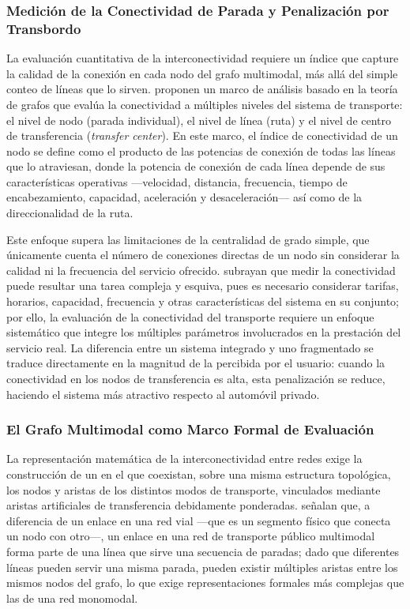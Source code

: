 \subsubsection{Medición de la Conectividad de Parada y Penalización por Transbordo}
\label{subsubsec:penalizacion-transbordo}

La evaluación cuantitativa de la interconectividad requiere un índice que capture la
calidad de la conexión en cada nodo del grafo multimodal, más allá del simple conteo
de líneas que lo sirven. \textcite{mishra2012} proponen un marco de análisis basado
en la teoría de grafos que evalúa la conectividad a múltiples niveles del sistema de
transporte: el nivel de nodo (parada individual), el nivel de línea (ruta) y el nivel de
centro de transferencia (\textit{transfer center}). En este marco, el índice de
conectividad de un nodo se define como el producto de las potencias de conexión de
todas las líneas que lo atraviesan, donde la potencia de conexión de cada línea
depende de sus características operativas ---velocidad, distancia, frecuencia, tiempo
de encabezamiento, capacidad, aceleración y desaceleración--- así como de la
direccionalidad de la ruta.

Este enfoque supera las limitaciones de la centralidad de grado simple, que
únicamente cuenta el número de conexiones directas de un nodo sin considerar la
calidad ni la frecuencia del servicio ofrecido. \textcite{mishra2012} subrayan que
medir la conectividad puede resultar una tarea compleja y esquiva, pues es necesario
considerar tarifas, horarios, capacidad, frecuencia y otras características del sistema
en su conjunto; por ello, la evaluación de la conectividad del transporte requiere un
enfoque sistemático que integre los múltiples parámetros involucrados en la
prestación del servicio real. La diferencia entre un sistema integrado y uno
fragmentado se traduce directamente en la magnitud de la  percibida por el usuario: cuando la conectividad en los nodos de
transferencia es alta, esta penalización se reduce, haciendo el sistema más atractivo
respecto al automóvil privado.

\subsubsection{El Grafo Multimodal como Marco Formal de Evaluación}
\label{subsubsec:grafo-multimodal}

La representación matemática de la interconectividad entre redes exige la
construcción de un  en el que coexistan, sobre una misma
estructura topológica, los nodos y aristas de los distintos modos de transporte,
vinculados mediante aristas artificiales de transferencia debidamente ponderadas.
\textcite{mishra2012} señalan que, a diferencia de un enlace en una red vial ---que
es un segmento físico que conecta un nodo con otro---, un enlace en una red de
transporte público multimodal forma parte de una línea que sirve una secuencia de
paradas; dado que diferentes líneas pueden servir una misma parada, pueden existir
múltiples aristas entre los mismos nodos del grafo, lo que exige representaciones
formales más complejas que las de una red monomodal.

